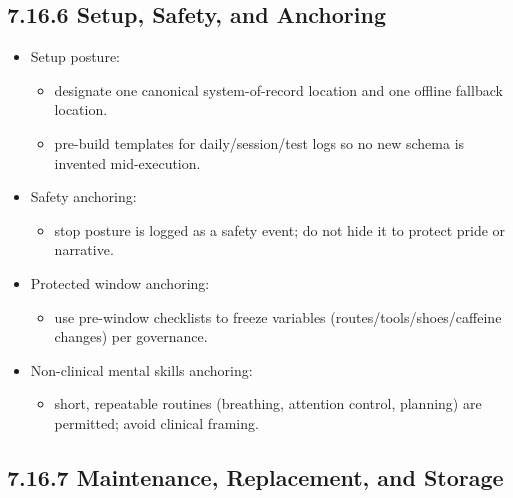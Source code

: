 \documentclass[10pt]{article}
\begin{document}
\subsection*{7.16.6 Setup, Safety, and Anchoring}
{}

\begin{itemize}
\item Setup posture:
  \begin{itemize}
  \item designate one canonical system-of-record location and one offline fallback location.
  \item pre-build templates for daily/session/test logs so no new schema is invented mid-execution.
  \end{itemize}
\item Safety anchoring:
  \begin{itemize}
  \item stop posture is logged as a safety event; do not hide it to protect pride or narrative.
  \end{itemize}
\item Protected window anchoring:
  \begin{itemize}
  \item use pre-window checklists to freeze variables (routes/tools/shoes/caffeine changes) per governance.
  \end{itemize}
\item Non-clinical mental skills anchoring:
  \begin{itemize}
  \item short, repeatable routines (breathing, attention control, planning) are permitted; avoid clinical framing.
  \end{itemize}
\end{itemize}

\subsection*{7.16.7 Maintenance, Replacement, and Storage}
{}
\end{document}

